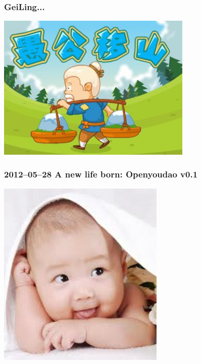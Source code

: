 \documentclass[10pt]{beamer}
\begin{document}
\begin{CJK*}{UTF8}{song}
\begin{frame}
\begin{center}
\end{center}

\end{frame}

\begin{frame}
  \frametitle{\Large{GeiLing...}}
  
\begin{center} 
  \includegraphics[width=0.7\textwidth]{challenge.jpg}

\end{center}

\end{frame}

\begin{frame}
  \frametitle{\Large{2012--05--28 A new life born: Openyoudao v0.1}}

\begin{center} 
  \includegraphics[width=0.6\textwidth]{newlife.jpg}
\href{run:youdao-v0.1.mp4}{}


\end{center}
\end{frame}
\end{CJK*}
\end{document}

